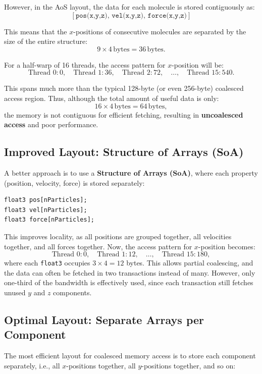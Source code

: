 \documentclass[12pt]{book}
\begin{document}
However, in the AoS layout, the data for each molecule is stored contiguously as:
\[
[\texttt{pos(x,y,z)},\, \texttt{vel(x,y,z)},\, \texttt{force(x,y,z)}]
\]

This means that the $x$-positions of consecutive molecules are separated by the size of the entire structure:
\[
9 \times 4\,\text{bytes} = 36\,\text{bytes}.
\]

For a half-warp of 16 threads, the access pattern for $x$-position will be:
\[
\text{Thread } 0: 0,\quad
\text{Thread } 1: 36,\quad
\text{Thread } 2: 72,\quad
\dots,\quad
\text{Thread } 15: 540.
\]

This spans much more than the typical 128-byte (or even 256-byte) coalesced access region. Thus, although the total amount of useful data is only:
\[
16 \times 4\,\text{bytes} = 64\,\text{bytes},
\]
the memory is not contiguous for efficient fetching, resulting in \textbf{uncoalesced access} and poor performance.

\subsection*{Improved Layout: Structure of Arrays (SoA)}

A better approach is to use a \textbf{Structure of Arrays (SoA)}, where each property (position, velocity, force) is stored separately:

\begin{lstlisting}[style=cppstyle]
float3 pos[nParticles];
float3 vel[nParticles];
float3 force[nParticles];
\end{lstlisting}

This improves locality, as all positions are grouped together, all velocities together, and all forces together. Now, the access pattern for $x$-position becomes:
\[
\text{Thread } 0: 0,\quad
\text{Thread } 1: 12,\quad
\dots,\quad
\text{Thread } 15: 180,
\]
where each \texttt{float3} occupies $3 \times 4 = 12$ bytes. This allows partial coalescing, and the data can often be fetched in two transactions instead of many. However, only one-third of the bandwidth is effectively used, since each transaction still fetches unused $y$ and $z$ components.

\subsection*{Optimal Layout: Separate Arrays per Component}

The most efficient layout for coalesced memory access is to store each component separately, i.e., all $x$-positions together, all $y$-positions together, and so on:
\end{document}
